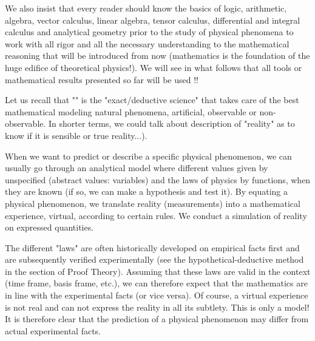 	We also insist that every reader should know the basics of logic, arithmetic, algebra, vector calculus, linear algebra, tensor calculus, differential and integral calculus and analytical geometry prior to the study of physical phenomena to work with all rigor and all the necessary understanding to the mathematical reasoning that will be introduced from now (mathematics is the foundation of the huge edifice of theoretical physics!). We will see in what follows that all tools or mathematical results presented so far will be used !!
	
	Let us recall that "" is the "exact/deductive science" that takes care of the best mathematical modeling natural phenomena, artificial, observable or non-observable. In shorter terms, we could talk about description of "reality" as to know if it is sensible or true reality...).
	
	When we want to predict or describe a specific physical phenomenon, we can usually go through an analytical model where different values given by unspecified (abstract values: variables) and the laws of physics by functions, when they are known (if so, we can make a hypothesis and test it). By equating a physical phenomenon, we translate reality (measurements) into a mathematical experience, virtual, according to certain rules. We conduct a simulation of reality on expressed quantities.
	
	The different "laws" are often historically developed on empirical facts first and are subsequently verified experimentally (see the hypothetical-deductive method in the section of Proof Theory). Assuming that these laws are valid in the context (time frame, basis frame, etc.), we can therefore expect that the mathematics are in line with the experimental facts (or vice versa). Of course, a virtual experience is not real and can not express the reality in all its subtlety. This is only a model! It is therefore clear that the prediction of a physical phenomenon may differ from actual experimental facts.
	
